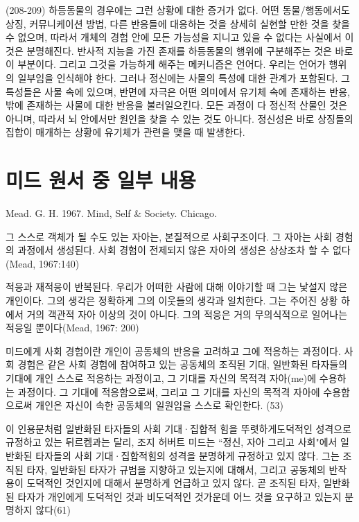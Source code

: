 \documentclass[12pt, a4paper]{article}
\begin{document}
(208-209) 하등동물의 경우에는 그런 상황에 대한 증거가 없다. 어떤 동물/행동에서도 상징, 커뮤니케이션 방법, 다른 반응들에 대응하는 것을 상세히 실현할 만한 것을 찾을 수 없으며, 따라서 개체의 경험 안에 모든 가능성을 지니고 있을 수 없다는 사실에서 이것은 분명해진다. 반사적 지능을 가진 존재를 하등동물의 행위에 구분해주는 것은 바로 이 부분이다. 그리고 그것을 가능하게 해주는 메커니즘은 언어다. 우리는 언어가 행위의 일부임을 인식해야 한다. 그러나 정신에는 사물의 특성에 대한 관계가 포함된다. 그 특성들은 사물 속에 있으며, 반면에 자극은 어떤 의미에서 유기체 속에 존재하는 반응, 밖에 존재하는 사물에 대한 반응을 불러일으킨다. 모든 과정이 다 정신적 산물인 것은 아니며, 따라서 뇌 안에서만 원인을 찾을 수 있는 것도 아니다. 정신성은 바로 상징들의 집합이 매개하는 상황에 유기체가 관련을 맺을 때 발생한다.

\section{미드 원서 중 일부 내용}

Mead. G. H. 1967. Mind, Self & Society. Chicago.

그 스스로 객체가 될 수도 있는 자아는, 본질적으로 사회구조이다. 그 자아는 사회 경험의 과정에서 생성된다. 사회 경험이 전제되지 않은 자아의 생성은 상상조차 할 수 없다(Mead, 1967:140)

적응과 재적응이 반복된다. 우리가 어떠한 사람에 대해 이야기할 때 그는 낯설지 않은 개인이다. 그의 생각은 정확하게 그의 이웃들의 생각과 일치한다. 그는 주어진 상황 하에서 거의 객관적 자아 이상의 것이 아니다. 그의 적응은 거의 무의식적으로 일어나는 적응일 뿐이다(Mead, 1967: 200)

미드에게 사회 경험이란 개인이 공동체의 반응을 고려하고 그에 적응하는 과정이다. 사회 경험은 같은 사회 경험에 참여하고 있는 공동체의 조직된 기대, 일반화된 타자들의 기대에 개인 스스로 적응하는 과정이고, 그 기대를 자신의 목적격 자아(me)에 수용하는 과정이다. 그 기대에 적응함으로써, 그리고 그 기대를 자신의 목적격 자아에 수용함으로써 개인은 자신이 속한 공동체의 일원임을 스스로 확인한다. (53)

이 인용문처럼 일반화된 타자들의 사회 기대·집합적 힘을 뚜렷하게도덕적인 성격으로 규정하고 있는 뒤르켐과는 달리, 조지 허버트 미드는 ``정신, 자아 그리고 사회"에서 일반화된 타자들의 사회 기대·집합적힘의 성격을 분명하게 규정하고 있지 않다. 그는 조직된 타자, 일반화된 타자가 규범을 지향하고 있는지에 대해서, 그리고 공동체의 반작용이 도덕적인 것인지에 대해서 분명하게 언급하고 있지 않다. 곧 조직된 타자, 일반화된 타자가 개인에게 도덕적인 것과 비도덕적인 것가운데 어느 것을 요구하고 있는지 분명하지 않다(61)
\end{document}

